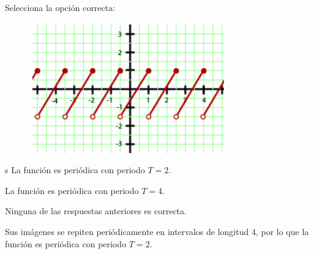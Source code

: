 \vspace{1cm}


\begin{scq}
	Selecciona la opción correcta:\\
	\begin{figure}
		\includegraphics{samples/propiedades/periodicidad2.jpg}
	\end{figure}
	\begin{choices}
		\begin{choice}[x]s
			La función es periódica con periodo $T=2$.	
		\end{choice}
		\begin{choice}
			La función es periódica con periodo $T=4$.
		\end{choice}	
		\begin{choice}
			Ninguna de las respuestas anteriores es correcta.
		\end{choice}
	\end{choices}
	\begin{feedback}
		Sus imágenes se repiten periódicamente en intervalos de longitud 4, por lo que la función es periódica con periodo $T=2$.
	\end{feedback}
\end{scq}

\vspace{1cm}


